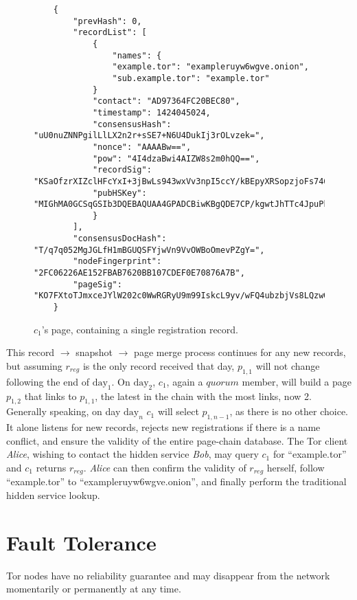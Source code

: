 \begin{figure}
\begin{lstlisting}
	{
		"prevHash": 0,
		"recordList": [
			{
				"names": {
				"example.tor": "exampleruyw6wgve.onion",
				"sub.example.tor": "example.tor"
			}
			"contact": "AD97364FC20BEC80",
			"timestamp": 1424045024,
			"consensusHash": "uU0nuZNNPgilLlLX2n2r+sSE7+N6U4DukIj3rOLvzek=",
			"nonce": "AAAABw==",
			"pow": "4I4dzaBwi4AIZW8s2m0hQQ==",
			"recordSig": 	"KSaOfzrXIZclHFcYxI+3jBwLs943wxVv3npI5ccY/kBEpyXRSopzjoFs746n0tJqUpdY4Kbe6DBwERaN7ELmSSK9Pu6q8QeKzNAh+QOnKl0fKBN7fqowjkQ3ktFkR0Vuox9WrrbNTMa4+up0Np52hlbKA3zSRz4fbR9NVlh6uuQ=",
			"pubHSKey": "MIGhMA0GCSqGSIb3DQEBAQUAA4GPADCBiwKBgQDE7CP/kgwtJhTTc4JpuPkvA7Ln9wgc+fgTKgkyUp1zusxgUAn1c1MGx4YhO42KPB7dyZOf3pcRk94XsYFY1ULkF2+tf9KdNe7GFzJyMFCQENnUcVXbcwLH4vAeiGK7R/nScbCbyc9LT+VE1fbKchTL1QzLVBLqJTxhR+9YPi8x+QIFAdZ8BJs="
			}
		],
		"consensusDocHash": "T/q7q052MgJGLfH1mBGUQSFYjwVn9VvOWBoOmevPZgY=",
		"nodeFingerprint": "2FC06226AE152FBAB7620BB107CDEF0E70876A7B",
		"pageSig": "KO7FXtoTJmxceJYlW202c0WwRGRyU9m99IskcL9yv/wFQ4ubzbjVs8LQzwQub9kDJ8Htpc9rRZvneRRbusFv1nvaeJw+WgRt+Tck0uapndHKYaQcK3XTIFYdmT1lLm7QxSKjnIxgBkwKT0QWdGLUhuRgGe5CXmqrPeDfU/gsgLs="
	}
\end{lstlisting}
\caption{$ c_{1} $'s page, containing a single registration record.}
\label{sampleLabel}
\end{figure}

This record $ \to $ snapshot $ \to $ page merge process continues for any new records, but assuming $ r_{reg} $ is the only record received that day, $ p_{1,1} $ will not change following the end of $ \textrm{day}_{1} $. On $ \textrm{day}_{2} $, $ c_{1} $, again a $ quorum $ member, will build a page $ p_{1,2} $ that links to $ p_{1,1} $, the latest in the chain with the most links, now 2. Generally speaking, on day $ \textrm{day}_{n} $ $ c_{1} $ will select $ p_{1,n-1} $, as there is no other choice. It alone listens for new records, rejects new registrations if there is a name conflict, and ensure the validity of the entire page-chain database. The Tor client \emph{Alice}, wishing to contact the hidden service \emph{Bob}, may query $ c_{1} $ for ``example.tor'' and $ c_{1} $ returns $ r_{reg} $. \emph{Alice} can then confirm the validity of $ r_{reg} $ herself, follow ``example.tor'' to ``exampleruyw6wgve.onion'', and finally perform the traditional hidden service lookup.

\section{Fault Tolerance}

Tor nodes have no reliability guarantee and may disappear from the network momentarily or permanently at any time. 



